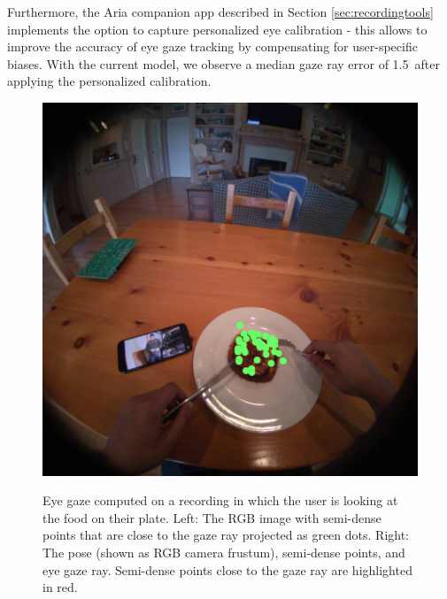 Furthermore, the Aria companion app described in Section \ref{sec:recordingtools} implements the option to capture personalized eye calibration - this allows to improve the accuracy of eye gaze tracking by compensating for user-specific biases. With the current model, we observe a median gaze ray error of 1.5\textdegree\ after applying the personalized calibration.

\begin{figure}[tbp]
    \centering
    \includegraphics[height=0.442\linewidth]{images/mps_gazeimg_example.jpg}%
\hfill%
{\setlength{\fboxsep}{0pt}%
\setlength{\fboxrule}{0.5pt}%
}
    \caption{Eye gaze computed on a recording in which the user is looking at the food on their plate. Left: The RGB image with semi-dense points that are close to the gaze ray projected as green dots. Right: The \AriaDevice{} pose (shown as RGB camera frustum), semi-dense points, and eye gaze ray. Semi-dense points close to the gaze ray are highlighted in red.}
    \label{fig:mps_gaze}
\end{figure}

